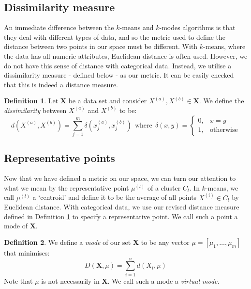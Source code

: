 \documentclass{article}
\theoremstyle{definition}
\newtheorem{definition}{Definition}[section]
\begin{document}
\subsection{Dissimilarity measure}\label{subsection:dissim}

An immediate difference between the $k$-means and $k$-modes algorithms is that they deal with different types of data, and so the metric used to define the distance between two points in our space must be different. With $k$-means, where the data has all-numeric attributes, Euclidean distance is often used. However, we do not have this sense of distance with categorical data. Instead, we utilise a dissimilarity measure - defined below - as our metric. It can be easily checked that this is indeed a distance measure. \\


\begin{definition}\label{def:dissim}
Let $\textbf{X}$ be a data set and consider $X^{(a)}, X^{(b)} \in \textbf{X}$. We define the \emph{dissimilarity} between $X^{(a)}$ and $X^{(b)}$ to be:
\[
	d(X^{(a)}, X^{(b)}) = \sum_{j=1}^{m} \delta(x_j^{(a)}, x_j^{(b)}) \ \ \text{where} \ \ \delta(x, y) = \begin{cases}
																																					0, & x = y \\
                                                                                                    												1, & \text{otherwise}
                                                                                               									 				  \end{cases}
\]
\end{definition}


\subsection{Representative points}\label{subsection:rep-points}

Now that we have defined a metric on our space, we can turn our attention to what we mean by the representative point $\mu^{(l)}$ of a cluster $C_l$. In $k$-means, we call $\mu^{(l)}$ a `centroid' and define it to be the average of all points $X^{(i)} \in C_l$ by Euclidean distance. With categorical data, we use our revised distance measure defined in Definition \ref{def:dissim} to specify a representative point. We call such a point a mode of \textbf{X}. \\

\begin{definition}\label{def:mode}
We define a \emph{mode} of our set \textbf{X} to be any vector $\mu = [\mu_1, \ldots, \mu_m]$ that minimises:
\begin{equation}
	D(\textbf{X}, \mu) = \sum_{i=1}^{n} d(X_i, \mu)
\end{equation}
Note that $\mu$ is not necessarily in \textbf{X}. We call such a mode a \emph{virtual mode}.
\end{definition}
\end{document}
